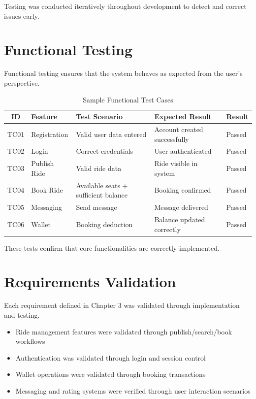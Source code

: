 Testing was conducted iteratively throughout development to detect and correct issues early.

\section{Functional Testing}

Functional testing ensures that the system behaves as expected from the user's perspective.

\begin{table}[H]
\centering
\caption{Sample Functional Test Cases}
\label{tab:functional-tests}
\begin{tabularx}{\textwidth}{c l X X X}
\toprule
\textbf{ID} & \textbf{Feature} & \textbf{Test Scenario} & \textbf{Expected Result} & \textbf{Result} \\
\midrule
TC01 & Registration & Valid user data entered & Account created successfully & Passed \\
TC02 & Login & Correct credentials & User authenticated & Passed \\
TC03 & Publish Ride & Valid ride data & Ride visible in system & Passed \\
TC04 & Book Ride & Available seats + sufficient balance & Booking confirmed & Passed \\
TC05 & Messaging & Send message & Message delivered & Passed \\
TC06 & Wallet & Booking deduction & Balance updated correctly & Passed \\
\bottomrule
\end{tabularx}
\end{table}

These tests confirm that core functionalities are correctly implemented.

\section{Requirements Validation}

Each requirement defined in Chapter 3 was validated through implementation and testing.

\begin{itemize}[noitemsep]
    \item Ride management features were validated through publish/search/book workflows
    \item Authentication was validated through login and session control
    \item Wallet operations were validated through booking transactions
    \item Messaging and rating systems were verified through user interaction scenarios
\end{itemize}

